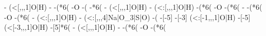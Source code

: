 \begin{struct}
{                                                  -
                                                    (<[,,,1]\textcolor{O}{O}|\textcolor{O}{H})
                                                  -
                                                  -(*6(
                                                    -\textcolor{O}{O}
                                                    -(
                                                      -*6(
                                                        -
                                                          (<[,,,1]\textcolor{O}{O}|\textcolor{O}{H})
                                                        -
                                                          (<:[,,,1]\textcolor{O}{O}|\textcolor{O}{H})
                                                        -(*6(
                                                          -\textcolor{O}{O}
                                                          -(*6(
                                                            -
                                                            -(*6(
                                                              -\textcolor{O}{O}
                                                              -(*6(
                                                                -
                                                                  (<:[,,,1]\textcolor{O}{O}|\textcolor{O}{H})
                                                                -
                                                                  (<:[,,,4]Na|\textcolor{O}{O}_3|S|\textcolor{O}{O})
                                                                -(
                                                                  -[-5]
                                                                  -[-3]
                                                                    (<:[-1,,,1]\textcolor{O}{O}|\textcolor{O}{H})
                                                                  -[-5]
                                                                    (<[-3,,,1]\textcolor{O}{O}|\textcolor{O}{H})
                                                                  -[5]*6(
                                                                    -
                                                                      (<[,,,1]\textcolor{O}{O}|\textcolor{O}{H})
                                                                    -
                                                                    -(*6(
                                                                      -\textcolor{O}{O}
                                                                      -(*6(
}
\end{struct}

